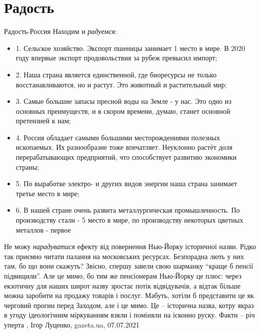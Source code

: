  
 
 
 
 
\chapter{Радость}
\label{sec:slova.radost}

Радость-Россия
Находим и \emph{радуемся}:
\begin{itemize}
  \item 1. Сельское хозяйство. Экспорт пшеницы занимает 1 место в мире. В 2020 году впервые экспорт продовольствия за рубеж превысил импорт;
  \item 2. Наша страна является единственной, где биоресурсы не только восстанавливаются, но и растут. Это животный и растительный мир;
  \item 3. Самые большие запасы пресной воды на Земле - у нас. Это одно из основных преимуществ, и в скором времени, думаю, станет основной претензией к нам;
  \item 4. Россия обладает самыми большими месторождениями полезных ископаемых. Их разнообразие тоже впечатляет. Неуклонно растёт доля перерабатывающих предприятий, что способствует развитию экономики страны;
  \item 5. По выработке электро- и других видов энергии наша страна занимает третье место в мире;
  \item 6. В нашей стране очень развита металлургическая промышленность. По производству стали - 5 место в мире, по производству некоторых цветных металлов - первое
\end{itemize}
  

Не можу \emph{нарадуватися} ефекту від повернення Нью-Йорку історичної назви.
Рідко так приємно читати палання на московських ресурсах. Безпорадна лють у них
там, бо що вони скажуть?  Звісно, спершу завели свою шарманку \enquote{краще б
пенсії підвищили}. Але це мимо, бо тим же пенсіонерам Нью-Йорку це плюс: через
екзотичну для наших широт назву зростає потік відвідувачів, а відтак більше
можна заробити на продажу товарів і послуг.  Мабуть, хотіли б представити це як
черговий прогин перед Заходом, але і це мимо. Це – історична назва, котру якраз
в угоду ідеологічним міркуванням взяли і поміняли на ісконно руску. Факти – річ
уперта
, 
Ігор Луценко, gazeta.ua, 07.07.2021

